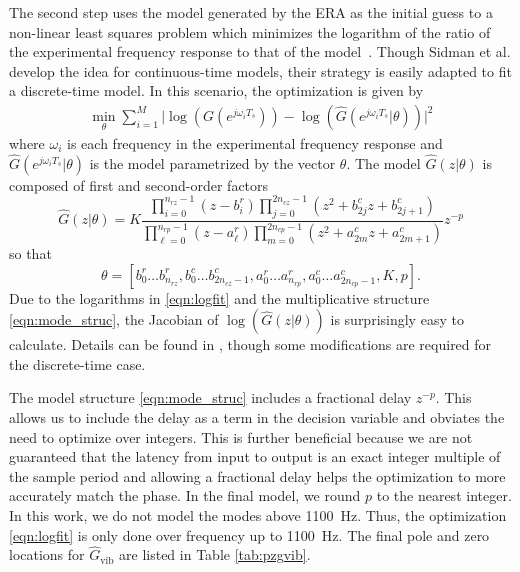\documentclass[twocolumn,twoside]{IEEEtran}
\newcommand{\hGv}{\ensuremath{\hat{G}_{\text{vib}}}\xspace}
\begin{document}
The second step uses the model generated by the ERA as the initial guess to a non-linear least squares problem which minimizes the logarithm of the ratio of the experimental frequency response to that of the model~\cite{sidman_parametric_1991}. Though Sidman et al. develop the idea for continuous-time models, their strategy is easily adapted to fit a discrete-time model. In this scenario, the optimization is given by
\begin{align}
\min_{\theta} \sum_{i=1}^M\bigl| \log(G(e^{j\omega_iT_s})) - \log(\hat{G}(e^{j\omega_iT_s}|\theta))\bigr|^2
\label{eqn:logfit}
\end{align}
where $\omega_i$ is each frequency in the experimental frequency response and $\hat{G}(e^{j\omega_iT_s}|\theta)$ is the model parametrized by the vector $\theta$. The model $\hat{G}(z|\theta)$ is composed of first and second-order factors
\begin{equation}
  \hat{G}(z|\theta) =K \frac{\prod_{i=0}^{n_{rz}-1} (z-b^r_i) \prod_{j=0}^{2n_{cz}-1}(z^2 +b^c_{2j}z + b^c_{2j+1})}
  { \prod_{\ell=0}^{n_{rp}-1}(z-a^r_\ell) \prod_{m=0}^{2n_{cp}-1}(z^2 +a^c_{2m}z + a^c_{2m+1})}z^{-p} \label{eqn:mode_struc}
\end{equation}
so that
\begin{equation}
\theta = [b^r_0\dots b^r_{n_{rz}}, b^c_{0}\dots b^c_{2n_{cz}-1}, a^r_0\dots a^r_{n_{rp}}, a^c_{0}\dots a^c_{2n_{cp}-1}, K, p].\nonumber
\end{equation}
Due to the logarithms in \eqref{eqn:logfit} and the multiplicative structure \eqref{eqn:mode_struc}, the Jacobian of $\log(\hat{G}(z|\theta))$ is surprisingly easy to calculate. Details can be found in \cite{sidman_parametric_1991}, though some modifications are required for the discrete-time case.

The model structure \eqref{eqn:mode_struc} includes a fractional delay $z^{-p}$. This allows us to include the delay as a term in the decision variable and obviates the need to optimize over integers. This is further beneficial because we are not guaranteed that the latency from input to output is an exact integer multiple of the sample period and allowing a fractional delay helps the optimization to more accurately match the phase. In the final model, we round $p$ to the nearest integer. In this work, we do not model the modes above 1100~Hz. Thus, the optimization \eqref{eqn:logfit} is only done over frequency up to 1100~Hz. The final pole and zero locations for $\hGv$ are listed in Table \ref{tab:pzgvib}.
\end{document}
